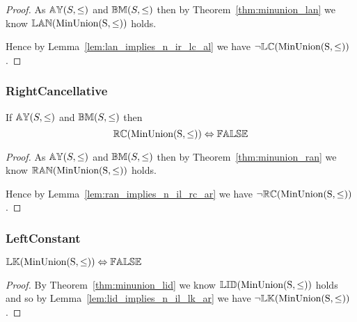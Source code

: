 \documentclass[../Summary.tex]{subfiles}
\begin{document}
\begin{proof}

\vspace{0.5em}
As ${\mathbb{AY}}(S, \leq)$ and ${\mathbb{BM}}(S, \leq)$ then by Theorem~\ref{thm:minunion_lan} we know ${\mathbb{LAN}}(\mathrm{MinUnion(S,\leq)})$ holds.

\vspace{0.5em}
Hence by Lemma~\ref{lem:lan_implies_n_ir_lc_al} we have $\neg {\mathbb{LC}}(\mathrm{MinUnion(S,\leq)})$.
\end{proof}




\subsubsection{RightCancellative}

\begin{theorem} \label{thm:minunion_rc}
If ${\mathbb{AY}}(S, \leq)$ and ${\mathbb{BM}}(S, \leq)$ then
\begin{equation*}
{\mathbb{RC}}(\mathrm{MinUnion(S,\leq)}) \Leftrightarrow {\mathbb{FALSE}}
\end{equation*}
\end{theorem}

\begin{proof}

\vspace{0.5em}
As ${\mathbb{AY}}(S, \leq)$ and ${\mathbb{BM}}(S, \leq)$ then by Theorem~\ref{thm:minunion_ran} we know ${\mathbb{RAN}}(\mathrm{MinUnion(S,\leq)})$ holds.

\vspace{0.5em}
Hence by Lemma~\ref{lem:ran_implies_n_il_rc_ar} we have $\neg {\mathbb{RC}}(\mathrm{MinUnion(S,\leq)})$.
\end{proof}





\subsubsection{LeftConstant}
\begin{theorem} \label{thm:minunion_lk}
${\mathbb{LK}}(\mathrm{MinUnion(S,\leq)}) \Leftrightarrow {\mathbb{FALSE}}$
\end{theorem}

\begin{proof}

\vspace{0.5em}

By Theorem~\ref{thm:minunion_lid} we know ${\mathbb{LID}}(\mathrm{MinUnion(S,\leq)})$ holds and so by Lemma~\ref{lem:lid_implies_n_il_lk_ar} we have $\neg {\mathbb{LK}}(\mathrm{MinUnion(S,\leq)})$.
\end{proof}
\end{document}
